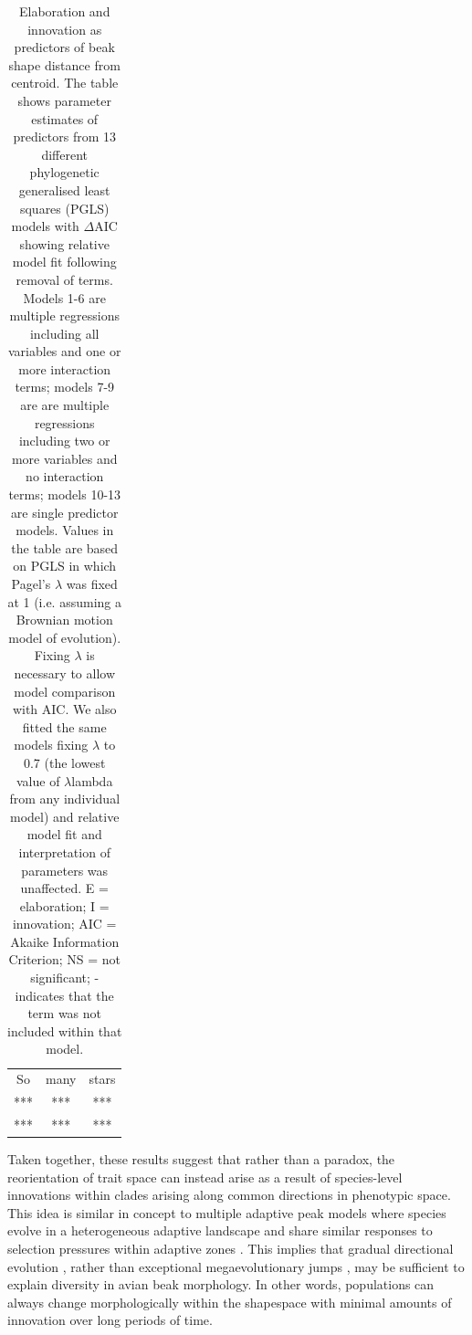 \documentclass[12pt,letterpaper]{article}
\begin{document}
\begin{table}
\begin{tabular}{ c c c }
 So & many & stars \\ 
 *** & *** & *** \\  
 *** & *** & *** \\
\end{tabular}
\caption{Elaboration and innovation as predictors of beak shape distance from centroid.
The table shows parameter estimates of predictors from  13 different phylogenetic generalised least squares (PGLS) models with $\Delta$AIC showing relative model fit following removal of terms. Models 1-6 are multiple regressions including all variables and one or more interaction terms; models 7-9 are are multiple regressions including two or more variables and no interaction terms; models 10-13 are single predictor models. Values in the table are based on PGLS in which Pagel’s $\lambda$ was fixed at 1 (i.e. assuming a Brownian motion model of evolution). Fixing $\lambda$ is necessary to allow model comparison with AIC. We also fitted the same models fixing $\lambda$ to 0.7 (the lowest value of $\lambda$lambda from any individual model) and relative model fit and interpretation of parameters was unaffected. E = elaboration; I = innovation; AIC = Akaike Information Criterion; NS = not significant; - indicates that the term was not included within that model.}
\label{Tab:pgls}
\end{table}

Taken together, these results suggest that rather than a paradox, the reorientation of trait space can instead arise as a result of species-level innovations within clades arising along common directions in phenotypic space.
This idea is similar in concept to multiple adaptive peak models where species evolve in a heterogeneous adaptive landscape and share similar responses to selection pressures within adaptive zones \cite{hansen1997stabilizing}.
This implies that gradual directional evolution \cite{pagel2022general}, rather than exceptional megaevolutionary jumps \cite{venditti2011multiple,cooney2017mega}, may be sufficient to explain diversity in avian beak morphology.
In other words, populations can always change morphologically within the shapespace with minimal amounts of innovation over long periods of time. %
\end{document}
